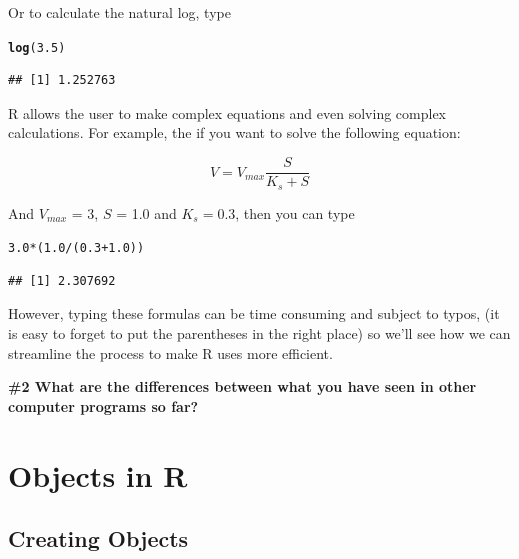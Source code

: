 \documentclass{tufte-handout}\usepackage[]{graphicx}\usepackage[]{color}
\makeatletter
\newcommand{\hlnum}[1]{\textcolor[rgb]{0.686,0.059,0.569}{#1}}%
\newcommand{\hlopt}[1]{\textcolor[rgb]{0,0,0}{#1}}%
\newcommand{\hlstd}[1]{\textcolor[rgb]{0.345,0.345,0.345}{#1}}%
\newcommand{\hlkwd}[1]{\textcolor[rgb]{0.737,0.353,0.396}{\textbf{#1}}}%
\newenvironment{kframe}{%
 \def\at@end@of@kframe{}%
 \ifinner\ifhmode%
  \def\at@end@of@kframe{\end{minipage}}%
  \begin{minipage}{\columnwidth}%
 \fi\fi%
 \def\FrameCommand##1{\hskip\@totalleftmargin \hskip-\fboxsep
 \colorbox{shadecolor}{##1}\hskip-\fboxsep
     \hskip-\linewidth \hskip-\@totalleftmargin \hskip\columnwidth}%
 \MakeFramed {\advance\hsize-\width
   \@totalleftmargin\z@ \linewidth\hsize
   \@setminipage}}%
 {\par\unskip\endMakeFramed%
 \at@end@of@kframe}
\newenvironment{knitrout}{}{} %
\makeatother
\begin{document}
Or to calculate the natural log, type
\begin{knitrout}
\color{fgcolor}\begin{kframe}
\begin{alltt}
\hlkwd{log}\hlstd{(}\hlnum{3.5}\hlstd{)}
\end{alltt}
\begin{verbatim}
## [1] 1.252763
\end{verbatim}
\end{kframe}
\end{knitrout}

R allows the user to make complex equations and even solving complex calculations. For example, the if you want to solve the following equation:

\begin{equation}
V = V_{max}\frac{S}{K_s + S}
\end{equation}

And $V_{max}$ = 3, $S$ = 1.0 and $K_s = 0.3$, then you can type

\begin{knitrout}
\color{fgcolor}\begin{kframe}
\begin{alltt}
\hlnum{3.0} \hlopt{*} \hlstd{(}\hlnum{1.0} \hlopt{/} \hlstd{(}\hlnum{0.3} \hlopt{+} \hlnum{1.0}\hlstd{))}
\end{alltt}
\begin{verbatim}
## [1] 2.307692
\end{verbatim}
\end{kframe}
\end{knitrout}

However, typing these formulas can be time consuming and subject to typos, (\eg it is easy to forget to put the parentheses in the right place) so we'll see how we can streamline the process to make R uses more efficient. 

\bigskip
\noindent \textbf{\#2 What are the differences between what you have seen in other computer programs so far? }

\section{Objects in R}

\subsection{Creating Objects}
\end{document}
